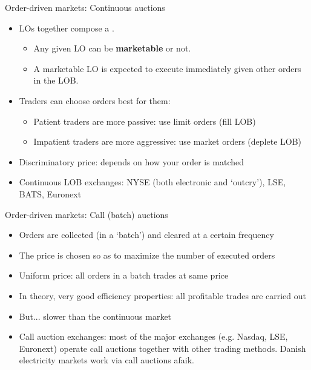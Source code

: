 \documentclass[english,10pt
,aspectratio=169
]{beamer}
\begin{document}
\begin{frame}{Order-driven markets: Continuous auctions}
\begin{itemize}
	\item LOs together compose a .
	\begin{itemize}
		\item Any given LO can be \textbf{marketable} or not.
		\item A marketable LO is expected to execute immediately given other orders in the LOB.
	\end{itemize}
	\item Traders can choose orders best for them:
	\begin{itemize}
		\item Patient traders are more passive: use limit orders (fill LOB)
		\item Impatient traders are more aggressive: use market orders (deplete LOB)
	\end{itemize}
	\item \alert{Discriminatory price}: depends on how your order is matched
	\item Continuous LOB exchanges: NYSE (both electronic and `outcry'), LSE, BATS, Euronext
\end{itemize}
\end{frame}


\begin{frame}{Order-driven markets: Call (batch) auctions}
\begin{itemize}
	\item Orders are collected (in a `batch') and cleared at a certain frequency
	\item The price is chosen so as to maximize the number of executed orders
	\item \alert{Uniform price}: all orders in a batch trades at same price
	\item In theory,  very good efficiency properties: all profitable trades are carried out
	\item But... slower than the continuous market
	\item Call auction exchanges: most of the major exchanges (e.g. Nasdaq, LSE, Euronext) operate call auctions together with other trading methods. Danish electricity markets work via call auctions afaik.
\end{itemize}
\end{frame}
\end{document}
